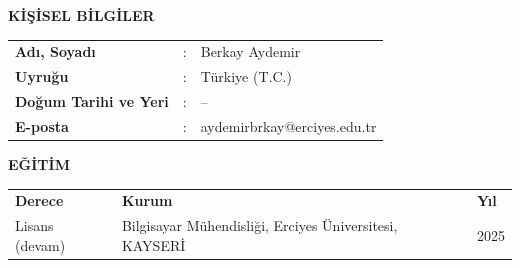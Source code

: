\textbf{KİŞİSEL BİLGİLER}\\

\renewcommand{\arraystretch}{1.5}
\begin{table}[h]
	\begin{tabular}{p{2.8cm}ll}
	\textbf{Adı, Soyadı }       & : & Berkay Aydemir \\
	\textbf{Uyruğu }            & : & Türkiye (T.C.)\\
	\textbf{Doğum Tarihi ve Yeri} & : & -- \\
	\textbf{E-posta}            & : & aydemirbrkay@erciyes.edu.tr \\
	\end{tabular}
\end{table}

\textbf{EĞİTİM}\\

\begin{tabular}{lll}
	\textbf{Derece} & \textbf{Kurum} & \textbf{Yıl}  \\
	Lisans (devam) & Bilgisayar Mühendisliği, Erciyes Üniversitesi, KAYSERİ & 2025 \\
\end{tabular}

